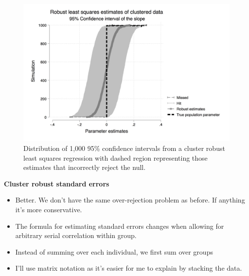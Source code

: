 \documentclass[notes=show]{beamer}
\begin{document}
\begin{frame}[plain]

\begin{figure}[htb]\centering \includegraphics[scale=0.15]{./lecture_includes/ls_ci_robust.jpg}
\caption{Distribution of 1,000 95\% confidence intervals from a cluster robust least squares regression with dashed region representing those estimates that incorrectly reject the null.}
\end{figure}

\end{frame}

\begin{frame}[plain]
\begin{center}
\textbf{Cluster robust standard errors}
\end{center}

\begin{itemize}
\item Better.  We don't have the same over-rejection problem as before. If anything it's more conservative.
\item The formula for estimating standard errors changes when allowing for arbitrary serial correlation within group.
\item Instead of summing over each individual, we first sum over groups
\item I'll use matrix notation as it's easier for me to explain by stacking the data.
\end{itemize}

\end{frame}
\end{document}
